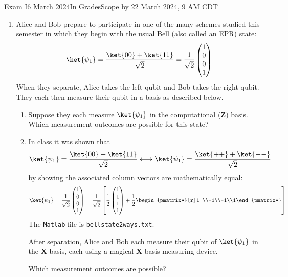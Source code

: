 \documentclass[12pt]{article}
\def\Bell{%
\BellTwo{00}{11}}
\def\BellTwo#1#2{%
\BellTwoSign{#1}{#2}{+}}
\def\BellTwoSign#1#2#3{%
\ensuremath{\frac{\ket{#1} #3 \ket{#2}}{\sqrt{2}}}}
\begin{document}
\begin{assignment}{Exam I}{6 March 2024}{In GradesScope by 22 March 2024, 9 AM CDT}
\begin{enumerate}
\clearpage\item\label{prob:follow} Alice and Bob prepare to participate in one of the
many schemes studied this semester in which they begin with the usual
Bell (also called an EPR) state:
\[ \ket{\psi_{1}} = \frac{\ket{00}+\ket{11}}{\sqrt{2}} = \frac{1}{\sqrt{2}} \begin{pmatrix} 1\\0\\0\\1\end{pmatrix}\]
When they separate, Alice takes the left qubit and Bob takes the right qubit.
They each then measure their qubit in a basis as described below.

\begin{enumerate}
\item{} Suppose they each measure $\ket{\psi_{1}}$ in the computational (\textbf{Z})
basis.
Which measurement outcomes are possible for this state?

\item{}
In class it was shown that
\[
\ket{\psi_{1}} = \Bell{} \longleftrightarrow \ket{\psi_{1}}= \frac{\ket{++}+\ket{--}}{\sqrt{2}}
\]
by showing the associated column vectors are mathematically equal:
\[
\ket{\psi_{1}} = \frac{1}{\sqrt{2}} \begin{pmatrix} 1\\0\\0\\1\end{pmatrix}
= \frac{1}{\sqrt{2}} \left[ \frac{1}{2}\begin{pmatrix}1\\1\\1\\1\end{pmatrix}
+  \frac{1}{2}\begin{pmatrix*}[r]1 \\-1\\-1\\1\end{pmatrix*}\right]
\]
The \texttt{Matlab} file is \texttt{bellstate2ways.txt}.

After separation, Alice and Bob each measure their qubit of $\ket{\psi_{1}}$ in the
\textbf{X} basis, each using a magical \textbf{X}-basis measuring device.  

Which measurement outcomes are possible?
\GenTable{+}{-}
\Continued{}


\end{enumerate}
\end{enumerate}
\end{assignment}
\end{document}
